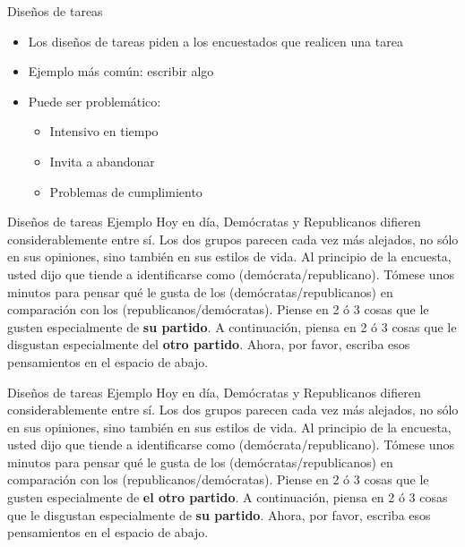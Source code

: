 \documentclass[
  ignorenonframetext,
]{beamer}
\providecommand{\tightlist}{%
  \setlength{\itemsep}{0pt}\setlength{\parskip}{0pt}}
\begin{document}
\begin{frame}{Diseños de tareas}
\protect\hypertarget{diseuxf1os-de-tareas}{}
\begin{itemize}
\tightlist
\item
  Los diseños de tareas piden a los encuestados que realicen una tarea
\item
  Ejemplo más común: escribir algo
\item
  Puede ser problemático:

  \begin{itemize}
  \tightlist
  \item
    Intensivo en tiempo
  \item
    Invita a abandonar
  \item
    Problemas de cumplimiento
  \end{itemize}
\end{itemize}
\end{frame}

\begin{frame}{Diseños de tareas Ejemplo}
\protect\hypertarget{diseuxf1os-de-tareas-ejemplo}{}
Hoy en día, Demócratas y Republicanos difieren considerablemente entre
sí. Los dos grupos parecen cada vez más alejados, no sólo en sus
opiniones, sino también en sus estilos de vida. Al principio de la
encuesta, usted dijo que tiende a identificarse como
(demócrata/republicano). Tómese unos minutos para pensar qué le gusta de
los (demócratas/republicanos) en comparación con los
(republicanos/demócratas). Piense en 2 ó 3 cosas que le gusten
especialmente de \textbf{su partido}. A continuación, piensa en 2 ó 3
cosas que le disgustan especialmente del \textbf{otro partido}. Ahora,
por favor, escriba esos pensamientos en el espacio de abajo.
\end{frame}

\begin{frame}{Diseños de tareas Ejemplo}
\protect\hypertarget{diseuxf1os-de-tareas-ejemplo-1}{}
Hoy en día, Demócratas y Republicanos difieren considerablemente entre
sí. Los dos grupos parecen cada vez más alejados, no sólo en sus
opiniones, sino también en sus estilos de vida. Al principio de la
encuesta, usted dijo que tiende a identificarse como
(demócrata/republicano). Tómese unos minutos para pensar qué le gusta de
los (demócratas/republicanos) en comparación con los
(republicanos/demócratas). Piense en 2 ó 3 cosas que le gusten
especialmente de \textbf{el otro partido}. A continuación, piensa en 2 ó
3 cosas que le disgustan especialmente de \textbf{su partido}. Ahora,
por favor, escriba esos pensamientos en el espacio de abajo.
\end{frame}
\end{document}
